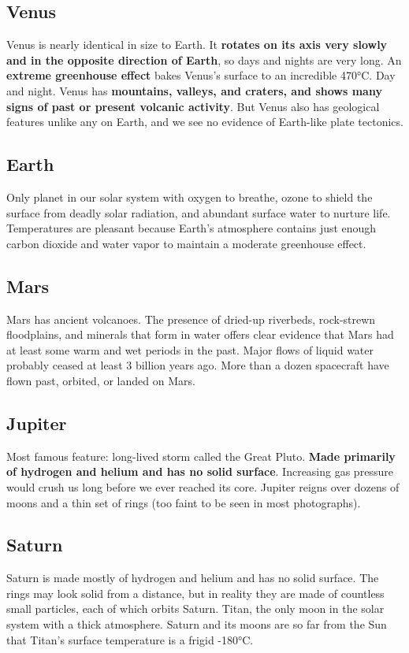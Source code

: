 \documentclass[12pt]{article}
\begin{document}
\subsection{Venus}
Venus is nearly identical in size to Earth. It {\bf rotates on its axis very slowly and in the opposite direction of Earth}, so days and nights are very long. An {\bf extreme greenhouse effect} bakes Venus’s surface to an incredible 470°C. Day and night. Venus has {\bf mountains, valleys, and craters, and shows many signs of past or present volcanic activity}. But Venus also has geological features unlike any on Earth, and we see no evidence of Earth-like plate tectonics.

\subsection{Earth}
Only planet in our solar system with oxygen to breathe, ozone to shield the surface from deadly solar radiation, and abundant surface water to nurture life. Temperatures are pleasant because Earth’s atmosphere contains just enough carbon dioxide and water vapor to maintain a moderate greenhouse effect.

\subsection{Mars}
Mars has ancient volcanoes. The presence of dried-up riverbeds, rock-strewn floodplains, and minerals that form in water offers clear evidence that Mars had at least some warm and wet periods in the past. Major flows of liquid water probably ceased at least 3 billion years ago. More than a dozen spacecraft have flown past, orbited, or landed on Mars.

\subsection{Jupiter}
Most famous feature: long-lived storm called the Great Pluto. {\bf Made primarily of hydrogen and helium and has no solid surface}. Increasing gas pressure would crush us long before we ever reached its core. Jupiter reigns over dozens of moons and a thin set of rings (too faint to be seen in most photographs).

\subsection{Saturn}
Saturn is made mostly of hydrogen and helium and has no solid surface. The rings may look solid from a distance, but in reality they are made of countless small particles, each of which orbits Saturn. Titan, the only moon in the solar system with a thick atmosphere. Saturn and its moons are so far from the Sun that Titan’s surface temperature is a
frigid -180°C.
\end{document}
